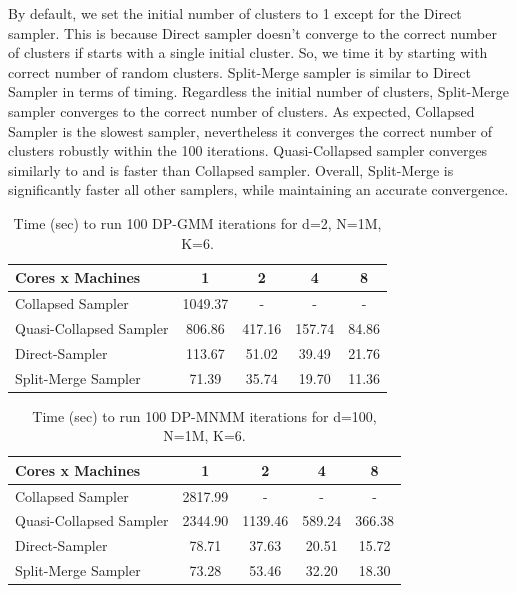 \documentclass[12pt, a4paper]{article}
\begin{document}
By default, we set the initial number of clusters to 1 except for the Direct sampler. This is because Direct sampler doesn't converge to the correct number of clusters if starts with a single initial cluster. So, we time it by starting with correct number of random clusters. Split-Merge sampler is similar to Direct Sampler in terms of timing. Regardless the initial number of clusters, Split-Merge sampler converges to the correct number of clusters. As expected, Collapsed Sampler is the slowest sampler, nevertheless it converges the correct number of clusters robustly within the 100 iterations. Quasi-Collapsed sampler converges similarly to and is faster than Collapsed sampler. Overall, Split-Merge is significantly faster all other samplers, while maintaining an accurate convergence. 

\begin{table}[]
\centering
\begin{tabular}{l|c|c|c|c|}
   \textbf{Cores x Machines}  & 1 & 2 & 4 & 8  \\
   \hline
   Collapsed Sampler & 1049.37   & -  & - &  -  \\
   Quasi-Collapsed Sampler & 806.86  & 417.16  & 157.74 &  84.86  \\
   Direct-Sampler & 113.67  & 51.02   &  39.49  &  21.76    \\
   Split-Merge Sampler & 71.39 & 35.74 & 19.70 & 11.36 \\
\end{tabular}
\caption{Time (sec) to run 100 DP-GMM iterations for d=2, N=1M, K=6.}
\label{tab:differenalgos}
\end{table}

\begin{table}[]
\centering
\begin{tabular}{l|c|c|c|c|}

  \textbf{Cores x Machines} & 1 & 2 & 4 & 8  \\   \hline
  Collapsed Sampler &  2817.99 & -  & - &  -  \\
  Quasi-Collapsed Sampler &  2344.90 & 1139.46  & 589.24 & 366.38   \\
  Direct-Sampler & 78.71  & 37.63   & 20.51  & 15.72   \\
  Split-Merge Sampler & 73.28 & 53.46 & 32.20 & 18.30\\

\end{tabular}
\caption{Time (sec) to run 100 DP-MNMM iterations for d=100, N=1M, K=6.}
\label{tab:differenalgos2}
\end{table}
\end{document}
